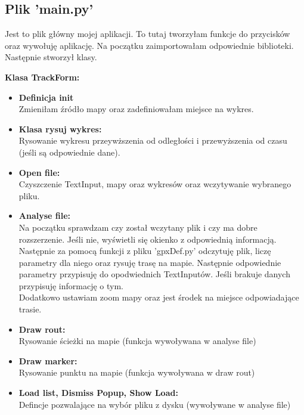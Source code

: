 \documentclass[10pt,a4paper]{article}
\begin{document}
\begin{itemize}
\subsection{Plik 'main.py'}
Jest to plik główny mojej aplikacji. To tutaj tworzyłam funkcje do przycisków oraz wywołuję aplikację. Na początku zaimportowałam odpowiednie biblioteki. Następnie stworzył klasy.

\vspace{0.5cm}
\textbf{Klasa TrackForm:}
\begin{itemize}
	
	\item \textbf{Definicja init} 
	\\Zmieniłam źródło mapy oraz zadefiniowałam miejsce na wykres.
	
	\item \textbf{Klasa rysuj wykres:}
	\\Rysowanie wykresu przeywższenia od odległości i przewyższenia od czasu (jeśli są odpowiednie dane).
	
	\item \textbf{Open file:}
	\\Czyszczenie TextInput, mapy oraz wykresów oraz wczytywanie wybranego pliku. 
	
	\item \textbf{Analyse file:}
	\\Na początku sprawdzam czy został wczytany plik i czy ma dobre rozszerzenie. Jeśli nie, wyświetli się okienko z odpowiednią informacją. Następnie za pomocą funkcji z pliku 'gpxDef.py' odczytuję plik, liczę parametry dla niego oraz rysuję trasę na mapie. Następnie odpowiednie parametry przypisuję do opodwiednich TextInputów. Jeśli brakuje danych przypisuję informację o tym. \\Dodatkowo ustawiam zoom mapy oraz jest środek na miejsce odpowiadające trasie.
	
	\item \textbf{Draw rout:}
	\\Rysowanie ścieżki na mapie (funkcja wywoływana w analyse file)
	
	\item \textbf{Draw marker:}
	\\Rysowanie punktu na mapie (funkcja wywoływana w draw rout)
	
	\item \textbf{Load list, Dismiss Popup, Show Load:}
	\\Defincje pozwalające na wybór pliku z dysku (wywoływane w analyse file)
\end{itemize}


\end{itemize}
\end{document}
